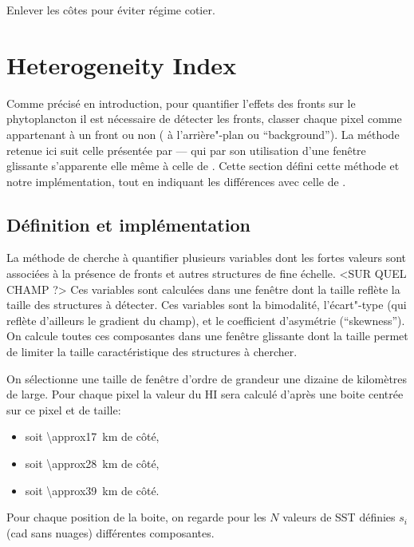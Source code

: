 \documentclass[index]{subfiles}
\begin{document}
Enlever les côtes pour éviter régime cotier.

\section{Heterogeneity Index}
\label{sec:HI}

Comme précisé en introduction, pour quantifier l'effets des fronts sur le phytoplancton il est nécessaire de détecter les fronts,  classer chaque pixel comme appartenant à un front ou non ( à l'arrière"-plan ou \enquote{background}).
La méthode retenue ici suit celle présentée par \textcite{liu_2016} --- qui par son utilisation d'une fenêtre glissante s'apparente elle même à celle de \textcite{cayula_1992}.
Cette section défini cette méthode et notre implémentation, tout en indiquant les différences avec celle de \textcite{liu_2016}.

\subsection{Définition et implémentation}
\label{sec:HI-definition}

La méthode de \textcite{liu_2016} cherche à quantifier plusieurs variables dont les fortes valeurs sont associées à la présence de fronts et autres structures de fine échelle.
<SUR QUEL CHAMP ?>
Ces variables sont calculées dans une fenêtre dont la taille reflète la taille des structures à détecter.
Ces variables sont la bimodalité, l'écart"-type (qui reflète d'ailleurs le gradient du champ), et le coefficient d'asymétrie (\enquote{skewness}).
On calcule toutes ces composantes dans une fenêtre glissante dont la taille permet de limiter la taille caractéristique des structures à chercher.

On sélectionne une taille de fenêtre d'ordre de grandeur une dizaine de kilomètres de large.
Pour chaque pixel la valeur du HI sera calculé d'après une boite centrée sur ce pixel et de taille:
\begin{itemize}
        \item {} soit \qty{\approx17}{\km} de côté,
        \item {} soit \qty{\approx28}{\km} de côté,
        \item {} soit \qty{\approx39}{\km} de côté.
\end{itemize}

Pour chaque position de la boite, on regarde pour les \(N\) valeurs de SST définies \(s_i\) (cad sans nuages) différentes composantes.
\end{document}
